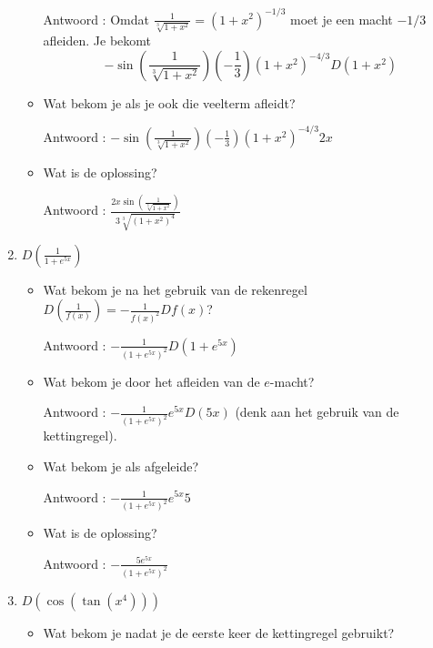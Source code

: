 \documentclass{article}
\begin{document}
\begin{enumerate}
\begin{itemize}
Antwoord : Omdat $\frac{1}{\sqrt[3]{1+x^2}}=\left( 1+x^2  \right)^{-1/3}$ moet je een macht $-1/3$ afleiden. Je bekomt
\[
-\sin \left(  \frac{1}{\sqrt[3]{1+x^2}} \right) \left( -\frac{1}{3}  \right) \left( 1+x^2  \right)^{-4/3}D\left( 1+x^2  \right)
\]

\item Wat bekom je als je ook die veelterm afleidt?

Antwoord : $-\sin \left(  \frac{1}{\sqrt[3]{1+x^2}} \right) \left( -\frac{1}{3}  \right) \left( 1+x^2  \right)^{-4/3}2x$

\item Wat is de oplossing?

Antwoord : $\frac {2x\sin \left( \frac {1}{\sqrt[3]{1+x^2}} \right)}{3 \sqrt[3]{\left( 1+x^2  \right) ^4}}$

\end{itemize}

\item $D \left( \frac {1}{1+e^{5x}} \right)$

\begin{itemize}

\item Wat bekom je na het gebruik van de rekenregel $D \left( \frac{1}{f(x)} \right)=-\frac {1}{f(x)^2}Df(x)$?

Antwoord : $-\frac{1}{\left( 1+e^{5x}  \right)^2}D \left ( 1+e^{5x} \right)$

\item Wat bekom je door het afleiden van de $e$-macht?

Antwoord : $-\frac{1}{\left( 1+e^{5x}  \right)^2}e^{5x}D(5x)$ (denk aan het gebruik van de kettingregel).

\item Wat bekom je als afgeleide?

Antwoord : $-\frac{1}{\left( 1+e^{5x}  \right)^2}e^{5x}5$

\item Wat is de oplossing?

Antwoord : $-\frac {5e^{5x}}{\left( 1+e^{5x}  \right)^2}$

\end{itemize}

\item $D \left( \cos \left( \tan \left(  x^4 \right)  \right)  \right)$

\begin{itemize}

\item Wat bekom je nadat je de eerste keer de kettingregel gebruikt?


\end{itemize}
\end{enumerate}
\end{document}
